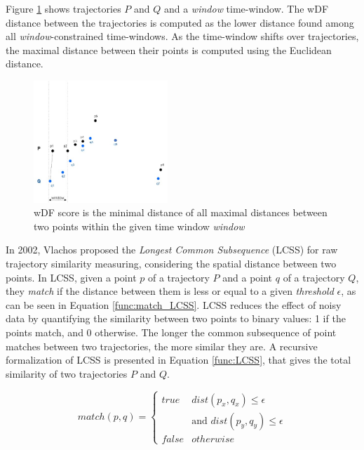 Figure \ref{fig:related_trajes_wDF} shows trajectories $P$ and $Q$ and a \emph{window} time-window. The wDF distance between the trajectories is computed as the lower distance found among all \emph{window}-constrained time-windows. As the time-window shifts over trajectories, the maximal distance between their points is computed using the Euclidean distance.

\begin{figure}[ht]
\centering
\includegraphics[width=0.45\textwidth]{Related_Works/related_trajes-wDF.jpg}
\caption{\label{fig:related_trajes_wDF}wDF score is the minimal distance of all maximal distances between two points within the given time window \textit{window}}
\end{figure}

In 2002, Vlachos \cite{vlachos2002discovering} proposed the \emph{Longest Common Subsequence} (LCSS) for raw trajectory similarity measuring, considering the spatial distance between two points. In LCSS, given a point $p$ of a trajectory $P$ and a point $q$ of a trajectory $Q$, they \textit{match} if the distance between them is less or equal to a given \textit{threshold} $\epsilon$, as can be seen in Equation \ref{func:match_LCSS}. LCSS reduces the effect of noisy data by quantifying the similarity between two points to binary values: 1 if the points match, and 0 otherwise. The longer the common subsequence of point matches between two trajectories, the more similar they are. 
A recursive formalization of LCSS is presented in Equation \ref{func:LCSS}{, that gives the total similarity of two trajectories $P$ and $Q$}.

\begin{equation}
\label{func:match_LCSS}
  match(p, q) = 
  \begin{cases} 
      true & dist(p_x, q_x)  \leq \epsilon\\ 
        &            \text{and } dist(p_y, q_y)  \leq \epsilon\\
      false & otherwise
  \end{cases}
\end{equation}

